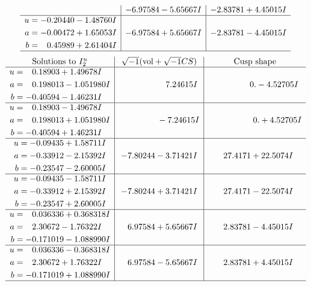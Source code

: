 \documentclass[1p]{elsarticle_modified}
\theoremstyle{definition}
\newcommand{\I}{\sqrt{-1}}
\begin{document}
$$\begin{array}{c|c|c}
 & -6.97584 - 5.65667 I & -2.83781 + 4.45015 I \\ \hline\begin{aligned}
u &= -0.20440 - 1.48760 I \\
a &= -0.00472 + 1.65053 I \\
b &= \phantom{-}0.45989 + 2.61404 I\end{aligned}
 & -6.97584 + 5.65667 I & -2.83781 - 4.45015 I\\
 \hline 
 \end{array}$$\newpage$$\begin{array}{c|c|c}  
\text{Solutions to }I^u_{2}& \I (\text{vol} + \sqrt{-1}CS) & \text{Cusp shape}\\
 \hline 
\begin{aligned}
u &= \phantom{-}0.18903 + 1.49678 I \\
a &= \phantom{-}0.198013 - 1.051980 I \\
b &= -0.40594 - 1.46231 I\end{aligned}
 & \phantom{-0.000000 -}7.24615 I & \phantom{-0.000000 } 0. - 4.52705 I \\ \hline\begin{aligned}
u &= \phantom{-}0.18903 - 1.49678 I \\
a &= \phantom{-}0.198013 + 1.051980 I \\
b &= -0.40594 + 1.46231 I\end{aligned}
 & \phantom{-0.000000 } -7.24615 I & \phantom{-0.000000 -}0. + 4.52705 I \\ \hline\begin{aligned}
u &= -0.09435 + 1.58711 I \\
a &= -0.33912 - 2.15392 I \\
b &= -0.23547 - 2.60005 I\end{aligned}
 & -7.80244 - 3.71421 I & \phantom{-}27.4171 + 22.5074 I \\ \hline\begin{aligned}
u &= -0.09435 - 1.58711 I \\
a &= -0.33912 + 2.15392 I \\
b &= -0.23547 + 2.60005 I\end{aligned}
 & -7.80244 + 3.71421 I & \phantom{-}27.4171 - 22.5074 I \\ \hline\begin{aligned}
u &= \phantom{-}0.036336 + 0.368318 I \\
a &= \phantom{-}2.30672 - 1.76322 I \\
b &= -0.171019 - 1.088990 I\end{aligned}
 & \phantom{-}6.97584 + 5.65667 I & \phantom{-}2.83781 - 4.45015 I \\ \hline\begin{aligned}
u &= \phantom{-}0.036336 - 0.368318 I \\
a &= \phantom{-}2.30672 + 1.76322 I \\
b &= -0.171019 + 1.088990 I\end{aligned}
 & \phantom{-}6.97584 - 5.65667 I & \phantom{-}2.83781 + 4.45015 I\\
 \hline 
 \end{array}$$\newpage
\end{document}
